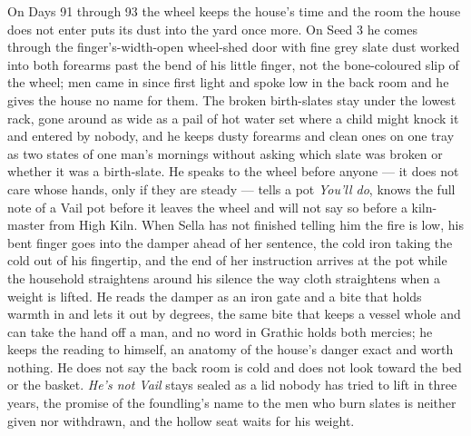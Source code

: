 \documentclass{design/chronicle}
\begin{document}
{On Days 91 through 93 the wheel keeps the house’s time and the room the house does not enter puts its dust into the yard once more. On Seed 3 he comes through the finger’s-width-open wheel-shed door with fine grey slate dust worked into both forearms past the bend of his little finger, not the bone-coloured slip of the wheel; men came in since first light and spoke low in the back room and he gives the house no name for them. The broken birth-slates stay under the lowest rack, gone around as wide as a pail of hot water set where a child might knock it and entered by nobody, and he keeps dusty forearms and clean ones on one tray as two states of one man’s mornings without asking which slate was broken or whether it was a birth-slate. He speaks to the wheel before anyone --- it does not care whose hands, only if they are steady --- tells a pot \emph{You’ll do}, knows the full note of a Vail pot before it leaves the wheel and will not say so before a kiln-master from High Kiln. When Sella has not finished telling him the fire is low, his bent finger goes into the damper ahead of her sentence, the cold iron taking the cold out of his fingertip, and the end of her instruction arrives at the pot while the household straightens around his silence the way cloth straightens when a weight is lifted. He reads the damper as an iron gate and a bite that holds warmth in and lets it out by degrees, the same bite that keeps a vessel whole and can take the hand off a man, and no word in Grathic holds both mercies; he keeps the reading to himself, an anatomy of the house’s danger exact and worth nothing. He does not say the back room is cold and does not look toward the bed or the basket. \emph{He’s not Vail} stays sealed as a lid nobody has tried to lift in three years, the promise of the foundling’s name to the men who burn slates is neither given nor withdrawn, and the hollow seat waits for his weight.

}
\end{document}
